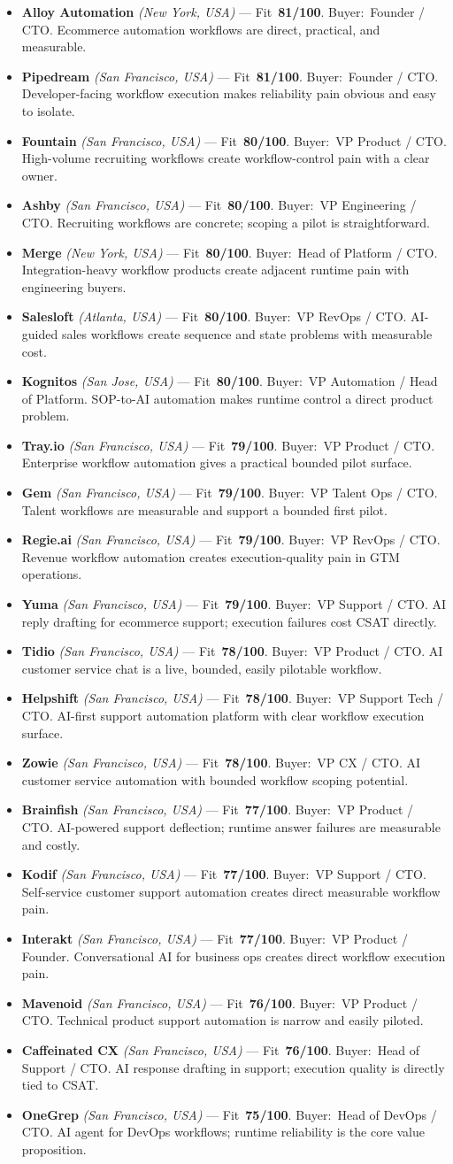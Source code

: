 \documentclass[10pt]{article}
\newcommand{\cand}[5]{\item \textbf{#1} \textit{(#2)} --- Fit~\textbf{#3/100}. Buyer:~#4. #5}
\begin{document}
\begin{itemize}
\cand{Alloy Automation}{New York, USA}{81}{Founder / CTO}{Ecommerce automation workflows are direct, practical, and measurable.}
\cand{Pipedream}{San Francisco, USA}{81}{Founder / CTO}{Developer-facing workflow execution makes reliability pain obvious and easy to isolate.}
\cand{Fountain}{San Francisco, USA}{80}{VP Product / CTO}{High-volume recruiting workflows create workflow-control pain with a clear owner.}
\cand{Ashby}{San Francisco, USA}{80}{VP Engineering / CTO}{Recruiting workflows are concrete; scoping a pilot is straightforward.}
\cand{Merge}{New York, USA}{80}{Head of Platform / CTO}{Integration-heavy workflow products create adjacent runtime pain with engineering buyers.}
\cand{Salesloft}{Atlanta, USA}{80}{VP RevOps / CTO}{AI-guided sales workflows create sequence and state problems with measurable cost.}
\cand{Kognitos}{San Jose, USA}{80}{VP Automation / Head of Platform}{SOP-to-AI automation makes runtime control a direct product problem.}
\cand{Tray.io}{San Francisco, USA}{79}{VP Product / CTO}{Enterprise workflow automation gives a practical bounded pilot surface.}
\cand{Gem}{San Francisco, USA}{79}{VP Talent Ops / CTO}{Talent workflows are measurable and support a bounded first pilot.}
\cand{Regie.ai}{San Francisco, USA}{79}{VP RevOps / CTO}{Revenue workflow automation creates execution-quality pain in GTM operations.}
\cand{Yuma}{San Francisco, USA}{79}{VP Support / CTO}{AI reply drafting for ecommerce support; execution failures cost CSAT directly.}
\cand{Tidio}{San Francisco, USA}{78}{VP Product / CTO}{AI customer service chat is a live, bounded, easily pilotable workflow.}
\cand{Helpshift}{San Francisco, USA}{78}{VP Support Tech / CTO}{AI-first support automation platform with clear workflow execution surface.}
\cand{Zowie}{San Francisco, USA}{78}{VP CX / CTO}{AI customer service automation with bounded workflow scoping potential.}
\cand{Brainfish}{San Francisco, USA}{77}{VP Product / CTO}{AI-powered support deflection; runtime answer failures are measurable and costly.}
\cand{Kodif}{San Francisco, USA}{77}{VP Support / CTO}{Self-service customer support automation creates direct measurable workflow pain.}
\cand{Interakt}{San Francisco, USA}{77}{VP Product / Founder}{Conversational AI for business ops creates direct workflow execution pain.}
\cand{Mavenoid}{San Francisco, USA}{76}{VP Product / CTO}{Technical product support automation is narrow and easily piloted.}
\cand{Caffeinated CX}{San Francisco, USA}{76}{Head of Support / CTO}{AI response drafting in support; execution quality is directly tied to CSAT.}
\cand{OneGrep}{San Francisco, USA}{75}{Head of DevOps / CTO}{AI agent for DevOps workflows; runtime reliability is the core value proposition.}

\end{itemize}
\end{document}

